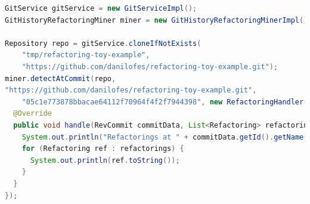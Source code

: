 \documentclass[14pt]{matmex-diploma-custom}
\begin{document}
\begin{lstlisting}[language=Java, style=basic, caption={Пример работы с API RefactoringMiner}, captionpos=b, label=rminer]
GitService gitService = new GitServiceImpl();
GitHistoryRefactoringMiner miner = new GitHistoryRefactoringMinerImpl();

Repository repo = gitService.cloneIfNotExists(
    "tmp/refactoring-toy-example",
    "https://github.com/danilofes/refactoring-toy-example.git");
miner.detectAtCommit(repo, 
"https://github.com/danilofes/refactoring-toy-example.git",
    "05c1e773878bbacae64112f70964f4f2f7944398", new RefactoringHandler() {
  @Override
  public void handle(RevCommit commitData, List<Refactoring> refactorings) {
    System.out.println("Refactorings at " + commitData.getId().getName());
    for (Refactoring ref : refactorings) {
      System.out.println(ref.toString());
    }
  }
});
\end{lstlisting}
\setmonofont[Mapping=tex-text]{CMU Typewriter Text}


\end{document}
